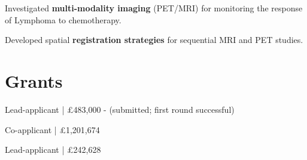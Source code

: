 \documentclass[]{mbcv}
\begin{document}
\begin{minipage}[t]{0.65\textwidth}
\begin{tightemize}
\item Investigated \textbf{multi-modality imaging} (PET/MRI) for monitoring the response of Lymphoma to chemotherapy.
\item Developed spatial \textbf{registration strategies} for sequential MRI and PET studies.
\end{tightemize}
\sectionsep

\section{Grants}
Lead-applicant | £483,000 - (submitted; first round successful)

\sectionsep

Co-applicant | £1,201,674

\sectionsep

Lead-applicant | £242,628


\end{minipage}
\end{document}

